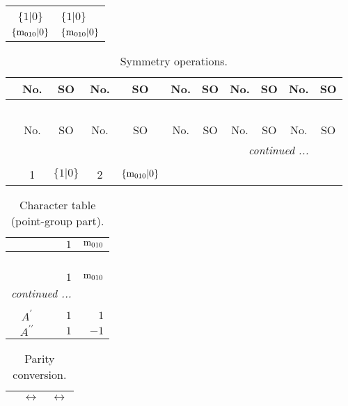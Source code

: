 \documentclass[fleqn,10pt,landscape]{article}
\begin{document}
\begin{itemize}
\begin{center}
\begin{longtable}{c|l}
 \hline \hline
\multicolumn{1}{r}{} \\ \endlastfoot

$\{1|0\}$ & $\{1|0\}$ \\ \hline
$\{{\rm m}_{010}|0\}$ & $\{{\rm m}_{010}|0\}$ \\
\end{longtable}
\end{center}
\begin{center}
\renewcommand{\arraystretch}{1.3}
\begin{longtable}{c|cc|cc|cc|cc|cc}
\caption{Symmetry operations.}
 \\
 \hline \hline
 & No. & SO & No. & SO & No. & SO & No. & SO & No. & SO \\ \hline \endfirsthead

\multicolumn{10}{l}{\tablename\ \thetable{}} \\
 \hline \hline
 & No. & SO & No. & SO & No. & SO & No. & SO & No. & SO \\ \hline \endhead

 \hline \hline
\multicolumn{10}{r}{\footnotesize\it continued ...} \\ \endfoot

 \hline \hline
\multicolumn{10}{r}{} \\ \endlastfoot

 & 1 & $\{1|0\}$ & 2 & $\{{\rm m}_{010}|0\}$ \\
\end{longtable}
\end{center}
\begin{center}
\renewcommand{\arraystretch}{1.0}
\begin{longtable}{c|rr}
\caption{Character table (point-group part).}
 \\
 \hline \hline
 & $ 1 $ & $ {\rm m}_{010} $ \\ \hline \endfirsthead

\multicolumn{2}{l}{\tablename\ \thetable{}} \\
 \hline \hline
 & $ 1 $ & $ {\rm m}_{010} $ \\ \hline \endhead

 \hline \hline
\multicolumn{2}{r}{\footnotesize\it continued ...} \\ \endfoot

 \hline \hline
\multicolumn{2}{r}{} \\ \endlastfoot

$ A^{\prime} $ & $ 1 $ & $ 1 $ \\
$ A^{\prime\prime} $ & $ 1 $ & $ -1 $ \\
\end{longtable}
\end{center}
\begin{center}
\renewcommand{\arraystretch}{1.0}
\begin{longtable}{ccc}
\caption{Parity conversion.}
 \\
 \hline \hline
 & $\leftrightarrow$ & $\leftrightarrow$ \\ \hline \endfirsthead


\end{longtable}
\end{center}
\end{itemize}
\end{document}
